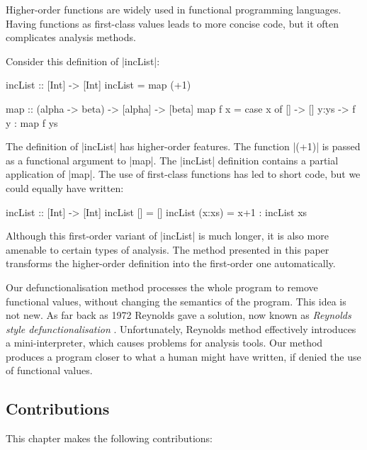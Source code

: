 Higher-order functions are widely used in functional programming languages.  Having functions as first-class values leads to more concise code, but it often complicates analysis methods.

\begin{example}
\label{ex:incList}

Consider this definition of |incList|:

\begin{code}
incList :: [Int] -> [Int]
incList = map (+1)

map :: (alpha -> beta) -> [alpha] -> [beta]
map f x = case  x of
                []    -> []
                y:ys  -> f y : map f ys
\end{code}

The definition of |incList| has higher-order features. The function |(+1)| is passed as a functional argument to |map|. The |incList| definition contains a partial application of |map|. The use of first-class functions has led to short code, but we could equally have written:

\begin{code}
incList :: [Int] -> [Int]
incList []      = []
incList (x:xs)  = x+1 : incList xs
\end{code}

Although this first-order variant of |incList| is much longer, it is also more amenable to certain types of analysis. The method presented in this paper transforms the higher-order definition into the first-order one automatically.
\end{example}

Our defunctionalisation method processes the whole program to remove functional values, without changing the semantics of the program. This idea is not new. As far back as 1972 Reynolds gave a solution, now known as \textit{Reynolds style defunctionalisation} \cite{reynolds:defunc}. Unfortunately, Reynolds method effectively introduces a mini-interpreter, which causes problems for analysis tools. Our method produces a program closer to what a human might have written, if denied the use of functional values.


\subsection{Contributions}

This chapter makes the following contributions:

